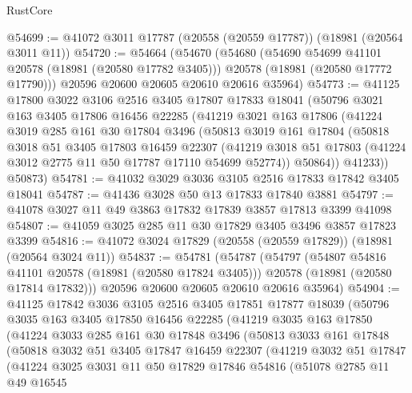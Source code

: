 \begin{lexlean}{RustCore}
\begin{coremodule}
@54699 := @41072 @3011 @17787 (@20558 (@20559 @17787)) (@18981 (@20564 @3011 @11))
@54720 := @54664
    (@54670
      (@54680
        (@54690 @54699 @41101 @20578 (@18981 (@20580 @17782 @3405)))
        @20578
        (@18981 (@20580 @17772 @17790)))
      @20596
      @20600
      @20605
      @20610
      @20616
      @35964)
@54773 := @41125
    @17800
    @3022
    @3106
    @2516
    @3405
    @17807
    @17833
    @18041
    (@50796
      @3021
      @163
      @3405
      @17806
      @16456
      @22285
      (@41219
        @3021
        @163
        @17806
        (@41224
          @3019
          @285
          @161
          @30
          @17804
          @3496
          (@50813
            @3019
            @161
            @17804
            (@50818
              @3018
              @51
              @3405
              @17803
              @16459
              @22307
              (@41219 @3018 @51 @17803 (@41224 @3012 @2775 @11 @50 @17787 @17110 @54699 @52774))
              @50864))
          @41233))
      @50873)
@54781 := @41032 @3029 @3036 @3105 @2516 @17833 @17842 @3405 @18041
@54787 := @41436 @3028 @50 @13 @17833 @17840 @3881
@54797 := @41078 @3027 @11 @49 @3863 @17832 @17839 @3857 @17813 @3399 @41098
@54807 := @41059 @3025 @285 @11 @30 @17829 @3405 @3496 @3857 @17823 @3399
@54816 := @41072 @3024 @17829 (@20558 (@20559 @17829)) (@18981 (@20564 @3024 @11))
@54837 := @54781
    (@54787
      (@54797
        (@54807 @54816 @41101 @20578 (@18981 (@20580 @17824 @3405)))
        @20578
        (@18981 (@20580 @17814 @17832)))
      @20596
      @20600
      @20605
      @20610
      @20616
      @35964)
@54904 := @41125
    @17842
    @3036
    @3105
    @2516
    @3405
    @17851
    @17877
    @18039
    (@50796
      @3035
      @163
      @3405
      @17850
      @16456
      @22285
      (@41219
        @3035
        @163
        @17850
        (@41224
          @3033
          @285
          @161
          @30
          @17848
          @3496
          (@50813
            @3033
            @161
            @17848
            (@50818
              @3032
              @51
              @3405
              @17847
              @16459
              @22307
              (@41219
                @3032
                @51
                @17847
                (@41224
                  @3025
                  @3031
                  @11
                  @50
                  @17829
                  @17846
                  @54816
                  (@51078
                    @2785
                    @11
                    @49
                    @16545

\end{coremodule}
\end{lexlean}
